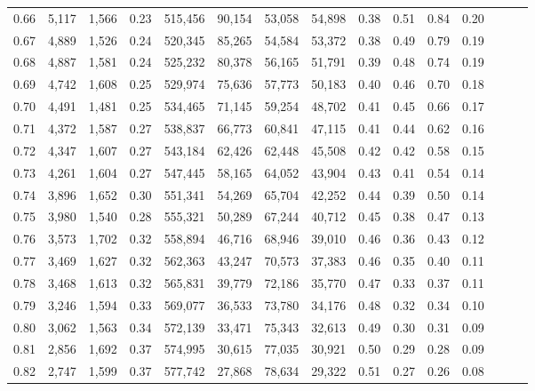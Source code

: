 \begin{tabular}{rrrrrrrrrrrrrrr}
0.66 &   5,117 &  1,566 &  0.23 &  515,456 &   90,154 &   53,058 &   54,898 &  0.38 &  0.51 &  0.84 &      0.20 \\
0.67 &   4,889 &  1,526 &  0.24 &  520,345 &   85,265 &   54,584 &   53,372 &  0.38 &  0.49 &  0.79 &      0.19 \\
0.68 &   4,887 &  1,581 &  0.24 &  525,232 &   80,378 &   56,165 &   51,791 &  0.39 &  0.48 &  0.74 &      0.19 \\
0.69 &   4,742 &  1,608 &  0.25 &  529,974 &   75,636 &   57,773 &   50,183 &  0.40 &  0.46 &  0.70 &      0.18 \\
0.70 &   4,491 &  1,481 &  0.25 &  534,465 &   71,145 &   59,254 &   48,702 &  0.41 &  0.45 &  0.66 &      0.17 \\
0.71 &   4,372 &  1,587 &  0.27 &  538,837 &   66,773 &   60,841 &   47,115 &  0.41 &  0.44 &  0.62 &      0.16 \\
0.72 &   4,347 &  1,607 &  0.27 &  543,184 &   62,426 &   62,448 &   45,508 &  0.42 &  0.42 &  0.58 &      0.15 \\
0.73 &   4,261 &  1,604 &  0.27 &  547,445 &   58,165 &   64,052 &   43,904 &  0.43 &  0.41 &  0.54 &      0.14 \\
0.74 &   3,896 &  1,652 &  0.30 &  551,341 &   54,269 &   65,704 &   42,252 &  0.44 &  0.39 &  0.50 &      0.14 \\
0.75 &   3,980 &  1,540 &  0.28 &  555,321 &   50,289 &   67,244 &   40,712 &  0.45 &  0.38 &  0.47 &      0.13 \\
0.76 &   3,573 &  1,702 &  0.32 &  558,894 &   46,716 &   68,946 &   39,010 &  0.46 &  0.36 &  0.43 &      0.12 \\
0.77 &   3,469 &  1,627 &  0.32 &  562,363 &   43,247 &   70,573 &   37,383 &  0.46 &  0.35 &  0.40 &      0.11 \\
0.78 &   3,468 &  1,613 &  0.32 &  565,831 &   39,779 &   72,186 &   35,770 &  0.47 &  0.33 &  0.37 &      0.11 \\
0.79 &   3,246 &  1,594 &  0.33 &  569,077 &   36,533 &   73,780 &   34,176 &  0.48 &  0.32 &  0.34 &      0.10 \\
0.80 &   3,062 &  1,563 &  0.34 &  572,139 &   33,471 &   75,343 &   32,613 &  0.49 &  0.30 &  0.31 &      0.09 \\
0.81 &   2,856 &  1,692 &  0.37 &  574,995 &   30,615 &   77,035 &   30,921 &  0.50 &  0.29 &  0.28 &      0.09 \\
0.82 &   2,747 &  1,599 &  0.37 &  577,742 &   27,868 &   78,634 &   29,322 &  0.51 &  0.27 &  0.26 &      0.08 \\

\end{tabular}
